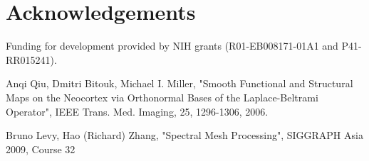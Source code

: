 \documentclass{InsightArticle}
\begin{document}
\section{Acknowledgements}

Funding for development provided by NIH grants (R01-EB008171-01A1 and P41-RR015241).

%
%


\begin{thebibliography}{100}
 Anqi Qiu, Dmitri Bitouk, Michael I. Miller,
"Smooth Functional and Structural Maps on the Neocortex via Orthonormal Bases
of the Laplace-Beltrami Operator",
IEEE Trans. Med. Imaging, 25, 1296-1306, 2006.

 Bruno Levy, Hao (Richard) Zhang,
"Spectral Mesh Processing", 
SIGGRAPH Asia 2009, Course 32

\end{thebibliography}
\end{document}

